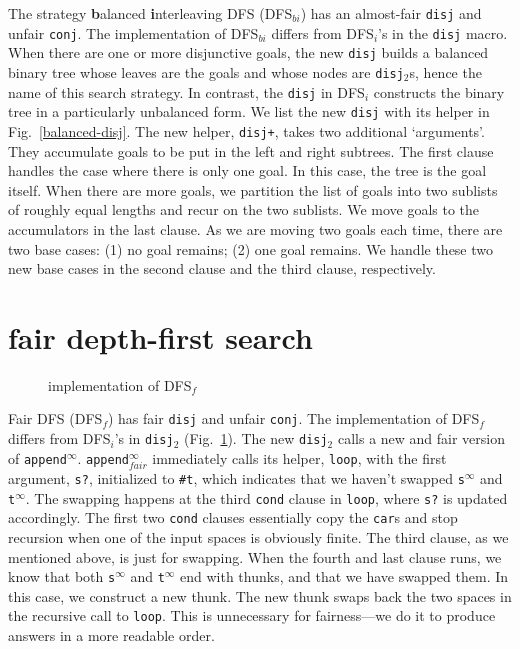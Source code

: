 \documentclass[format=acmlarge, review=false, authordraft=false]{acmart}
\newcommand{\conj}{\texttt{conj}}
\newcommand{\disj}{\texttt{disj}}
\newcommand{\disjtwo}{\texttt{disj$_2$}}
\newcommand{\appendInf}{\texttt{append$^\infty$}}
\newcommand{\appendInfFair}{\texttt{append$^\infty_{fair}$}}
\newcommand{\sInf}{\texttt{s$^\infty$}}
\newcommand{\tInf}{\texttt{t$^\infty$}}
\newcommand{\DFSi }[0]{DFS$_{i}$}
\newcommand{\DFSf }[0]{DFS$_{f}$}
\newcommand{\DFSbi}[0]{DFS$_{bi}$}
\begin{document}
The strategy \textbf{b}alanced \textbf{i}nterleaving DFS (\DFSbi{}) has an 
almost-fair \disj{} and unfair 
\conj{}. The implementation of \DFSbi{} differs from 
\DFSi{}'s in the \disj{} macro. When there are one or more disjunctive 
goals, the new \disj{} builds a balanced binary tree whose leaves are the goals 
and 
whose nodes are \disjtwo{}s, hence the name of this search strategy. 
In contrast, the \disj{} in \DFSi{} constructs the binary tree in a 
particularly unbalanced form.
We list the new \disj{} with its helper in Fig.~\ref{balanced-disj}.
The new helper, \texttt{disj+}, takes two additional `arguments'. They 
accumulate goals to be put in the left and right subtrees. The first clause 
handles the case where there is only one goal. In this case, the tree is the 
goal itself. When there are more goals, we partition the list of goals 
into two sublists of roughly equal lengths and recur on the two sublists. We 
move goals to the accumulators in the last clause. As we are moving 
two goals each time, there are two base cases: (1) no goal remains; (2) one 
goal remains. We handle these two new base cases in the second clause and the 
third clause, respectively. 

\section{fair depth-first search}

\begin{figure}
	
	\caption{implementation of \DFSf{}}
	\label{fDFS}
\end{figure}

Fair DFS (\DFSf) has fair \disj{} and unfair \conj{}. The 
implementation of \DFSf{} differs from \DFSi{}'s in 
\disjtwo{} (Fig.~\ref{fDFS}). The new \disjtwo{} calls a new and 
fair version of \appendInf{}. \appendInfFair{} 
immediately 
calls 
its helper, \texttt{loop}, with the first argument, \texttt{s?}, initialized to 
\texttt{\#{}t}, which indicates that we haven't swapped
\sInf{} and \tInf{}. The swapping 
happens at 
the third \texttt{cond} clause in \texttt{loop}, where \texttt{s?} is updated 
accordingly. The first two \texttt{cond} clauses essentially copy the 
\texttt{car}s and stop recursion when one of the input spaces is obviously 
finite. The third clause, as we mentioned above, is just for swapping. When the 
fourth and last clause runs, we know that both \sInf{} and 
\tInf{} end with thunks, and that we have swapped them. In 
this case, we construct a new thunk. The new thunk swaps back the two spaces in 
the
recursive call to \texttt{loop}. This is unnecessary for fairness---we do it to 
produce answers in a more readable order.
\end{document}
